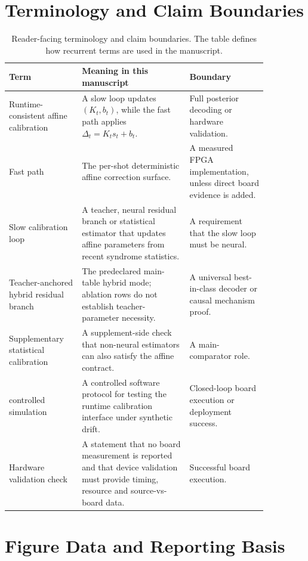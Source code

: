 \documentclass[11pt]{article}
\newcommand{\softwarehil}{controlled simulation}
\begin{document}
\section{Terminology and Claim Boundaries}

\begin{table}[htbp]
\centering
\small
\begin{tabular}{@{}>{\raggedright\arraybackslash}p{0.24\linewidth}>{\raggedright\arraybackslash}p{0.36\linewidth}>{\raggedright\arraybackslash}p{0.26\linewidth}@{}}
\toprule
Term & Meaning in this manuscript & Boundary \\
\midrule
Runtime-consistent affine calibration & A slow loop updates
\((K_t,b_t)\), while the fast path applies \(\Delta_t=K_t s_t+b_t\). &
Full posterior decoding or hardware validation. \\
\addlinespace
Fast path & The per-shot deterministic affine correction surface. & A measured
FPGA implementation, unless direct board evidence is added. \\
\addlinespace
Slow calibration loop & A teacher, neural residual branch or statistical
estimator that updates affine parameters from recent syndrome statistics. & A
requirement that the slow loop must be neural. \\
\addlinespace
Teacher-anchored hybrid residual branch & The predeclared main-table hybrid
mode; ablation rows do not establish teacher-parameter necessity. & A
universal best-in-class decoder or causal mechanism proof. \\
\addlinespace
Supplementary statistical calibration & A supplement-side check that non-neural
estimators can also satisfy the affine contract. & A main-comparator role. \\
\addlinespace
\softwarehil{} & A controlled software protocol for testing the runtime
calibration interface under synthetic drift. & Closed-loop board execution or deployment
success. \\
\addlinespace
Hardware validation check & A statement that no board measurement is
reported and that device validation must provide timing, resource and
source-vs-board data. & Successful board execution. \\
\bottomrule
\end{tabular}
\caption{Reader-facing terminology and claim boundaries.  The table defines
how recurrent terms are used in the manuscript.}
\label{tab:terminology}
\end{table}

\section{Figure Data and Reporting Basis}
\end{document}
